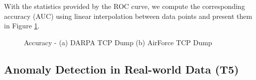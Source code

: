 With the statistics provided by the ROC curve, we compute the corresponding accuracy (AUC) using linear interpolation between data points and present them in Figure \ref{fig:t4.3_auc}. 


\begin{figure}[!ht]
    \centering
    \caption{Accuracy - (a) DARPA TCP Dump (b) AirForce TCP Dump}
    \label{fig:t4.3_auc}
\end{figure}



\subsection{Anomaly Detection in Real-world Data (T5)}

